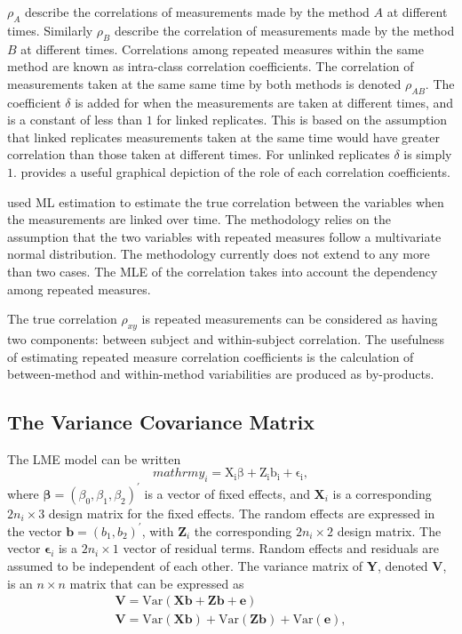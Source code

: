 \documentclass[12pt, a4paper]{report}
\theoremstyle{plain}
\theoremstyle{definition}
\theoremstyle{remark}
\begin{document}
		$\rho_{A}$ describe the correlations of measurements made by the method $A$ at different times. Similarly $\rho_{B}$ describe the correlation of measurements made by the method $B$ at different times. Correlations among repeated measures within the same method are known as intra-class correlation coefficients.  The correlation of measurements taken at the same same time by both methods is denoted $\rho_{AB}$. The coefficient $\delta$ is added for when the measurements are taken at different times, and is a constant of less than $1$ for linked replicates. This is based on the assumption that linked replicates measurements taken at the same time would have greater correlation than those taken at different times. For unlinked replicates $\delta$ is simply $1$. \citet{hamlett} provides a useful graphical depiction of the role of each correlation coefficients.
		
		\citet{lam} used ML estimation to estimate the true correlation between the variables when the measurements are linked over time. The methodology relies on the assumption that the two variables with repeated measures follow a multivariate normal distribution. The methodology currently does not extend to any more than two cases. The MLE of the correlation takes into account the dependency among repeated measures.
		
		The true correlation $\rho_{xy}$ is repeated measurements can be considered as having two components: between subject and within-subject correlation. The usefulness of estimating repeated measure correlation coefficients is the calculation of between-method and within-method variabilities are produced as by-products.
		
		\subsection{The Variance Covariance Matrix}
		The LME model can be written
		\[
		mathrm{y_{i}} = \mathrm{X_{i}\beta} + \mathrm{Z_{i}b_{i}} + \mathrm{\epsilon_{i}},
		\]
		where $\boldsymbol{\beta}=(\beta_0,\beta_1,\beta_2)^\prime$ is a vector of fixed effects, and $\boldsymbol{X}_i$ is a corresponding $2n_i\times 3$ design matrix for the fixed effects. The random effects are expressed in the vector $\boldsymbol{b}=(b_1,b_2)^\prime$, with $\boldsymbol{Z}_i$ the corresponding $2n_i\times 2$ design matrix. The vector $\boldsymbol{\epsilon}_i$ is a $2n_i\times 1$ vector of residual terms. Random effects and residuals are assumed to be independent of each other.
		The variance matrix of \textbf{Y}, denoted \textbf{V}, is an $n \times n$ matrix that can be expressed
		as 
		\begin{eqnarray}
		\textbf{V}= \textrm{Var} ( \textbf{Xb} + \textbf{Zb} + \textbf{e})\\
		\textbf{V}= \textrm{Var} ( \textbf{Xb} ) + \textrm{Var} (\textbf{Zb}) +
		\textrm{Var}(\textbf{e}),
		\end{eqnarray}
		
\end{document}
